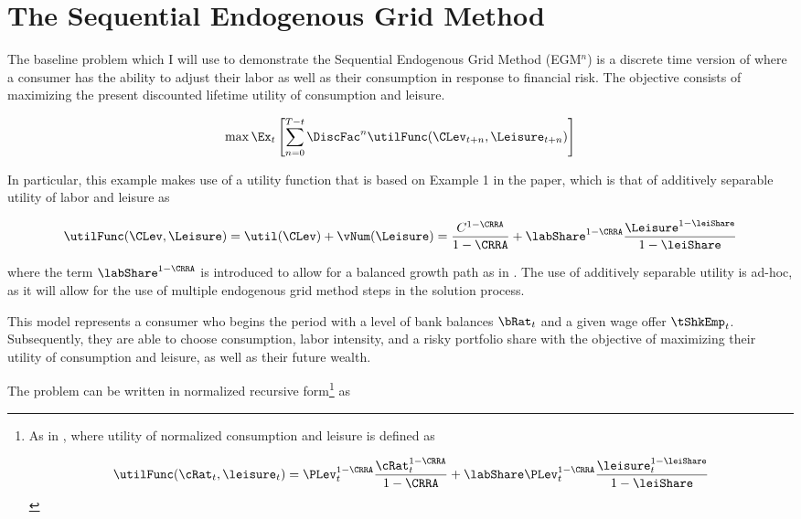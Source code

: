 \documentclass[\econtexRoot/SequentialEGM]{subfiles}
\begin{document}
\hypertarget{method}{}
\par\section{The Sequential Endogenous Grid Method}
\notinsubfile{\label{sec:method}}


The baseline problem which I will use to demonstrate the Sequential Endogenous Grid Method (EGM$^n$) is a discrete time version of \cite{Bodie1992-yp} where a consumer has the ability to adjust their labor as well as their consumption in response to financial risk. The objective consists of maximizing the present discounted lifetime utility of consumption and leisure.

\begin{equation}
        \max \Ex_{t} \left[ \sum_{n = 0}^{T-t} \DiscFac^{n} \utilFunc(\CLev_{t+n}, \Leisure_{t+n})  \right]
\end{equation}

In particular, this example makes use of a utility function that is based on Example 1 in the paper, which is that of additively separable utility of labor and leisure as

\begin{equation}
        \utilFunc(\CLev, \Leisure) = \util(\CLev) + \vNum(\Leisure) = \frac{C^{1-\CRRA}}{1-\CRRA} + \labShare^{1-\CRRA} \frac{\Leisure^{1-\leiShare}}{1-\leiShare}
\end{equation}

where the term $\labShare^{1-\CRRA}$ is introduced to allow for a balanced growth path as in \cite{Mertens2011-ap}. The use of additively separable utility is ad-hoc, as it will allow for the use of multiple endogenous grid method steps in the solution process.

This model represents a consumer who begins the period with a level of bank balances $\bRat_{t}$ and a given wage offer $\tShkEmp_{t}$. Subsequently, they are able to choose consumption, labor intensity, and a risky portfolio share with the objective of maximizing their utility of consumption and leisure, as well as their future wealth.

The problem can be written in normalized recursive form\footnote{
        As in \cite{Carroll2009-zq}, where utility of normalized consumption and leisure is defined as

        \begin{equation}
                \utilFunc(\cRat_{t}, \leisure_{t}) = \PLev_{t}^{1-\CRRA} \frac{\cRat_{t}^{1-\CRRA}}{1-\CRRA} + \labShare\PLev_{t}^{1-\CRRA} \frac{\leisure_{t}^{1-\leiShare}}{1-\leiShare}
        \end{equation}


} as
\end{document}
